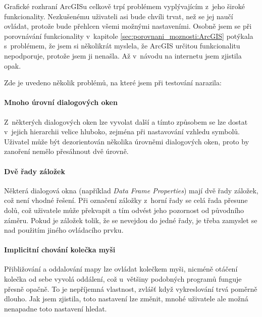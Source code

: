 \documentclass[a4paper,12pt,draft]{article}
\begin{document}
Grafické rozhraní ArcGISu celkově trpí problémem vyplývajícím z~jeho
široké funkcionality. Nezkušenému uživateli asi bude chvíli trvat,
 než se jej naučí ovládat, protože bude přehlcen všemi možnými
 nastaveními. Osobně jsem se při porovnávání funkcionality v~kapitole
 \ref{sec:porovnani_moznosti:ArcGIS} potýkala s~problémem, že jsem si
 několikrát myslela, že ArcGIS určitou funkcionalitu nepodporuje, protože
 jsem ji nenašla. Až v~návodu na internetu \cite{ArcGIS_help} jsem zjistila
opak.

Zde je uvedeno několik problémů, na které jsem při testování narazila:

\paragraph*{Mnoho úrovní dialogových oken} Z~některých dialogových oken
lze vyvolat další a tímto způsobem se lze dostat v~jejich hierarchii velice
hluboko, zejména při nastavování vzhledu symbolů.  Uživatel může být
dezorientován několika úrovněmi dialogových oken, proto by zanoření
nemělo přesáhnout dvě úrovně.

\paragraph*{Dvě řady záložek} Některá dialogová okna (například
\emph{Data Frame Properties}) mají dvě řady záložek, což není vhodné
řešení. Při označení záložky z~horní řady se celá řada přesune
dolů, což uživatele může překvapit a tím odvést jeho pozornost od
původního záměru. Pokud je záložek tolik, že se nevejdou do jedné
řady, je třeba zamyslet se nad použitím jiného ovládacího prvku.

\paragraph*{Implicitní chování kolečka myši} Přibližování a
oddalování mapy lze ovládat kolečkem myši, nicméně otáčení
kolečka od sebe vyvolá oddálení, což u~většiny podobných programů
funguje přesně opačně. To je nepříjemná vlastnost, zvlášť když
vykreslování trvá poměrně dlouho. Jak jsem zjistila, toto nastavení
lze změnit, mnohé uživatele ale možná nenapadne toto nastavení hledat.
\end{document}
